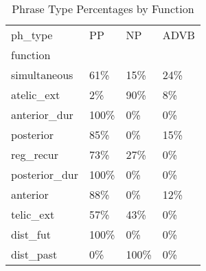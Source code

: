 \begin{table}[htbp!]
\centering
\caption{Phrase Type Percentages by Function}
\label{table:funcpt_pr}
\begin{tabular}{llll}
\toprule
ph\_type &    PP &    NP & ADVB \\
function      &       &       &      \\
\midrule
simultaneous  &   61\% &   15\% &  24\% \\
atelic\_ext    &    2\% &   90\% &   8\% \\
anterior\_dur  &  100\% &    0\% &   0\% \\
posterior     &   85\% &    0\% &  15\% \\
reg\_recur     &   73\% &   27\% &   0\% \\
posterior\_dur &  100\% &    0\% &   0\% \\
anterior      &   88\% &    0\% &  12\% \\
telic\_ext     &   57\% &   43\% &   0\% \\
dist\_fut      &  100\% &    0\% &   0\% \\
dist\_past     &    0\% &  100\% &   0\% \\
\bottomrule
\end{tabular}
\end{table}
